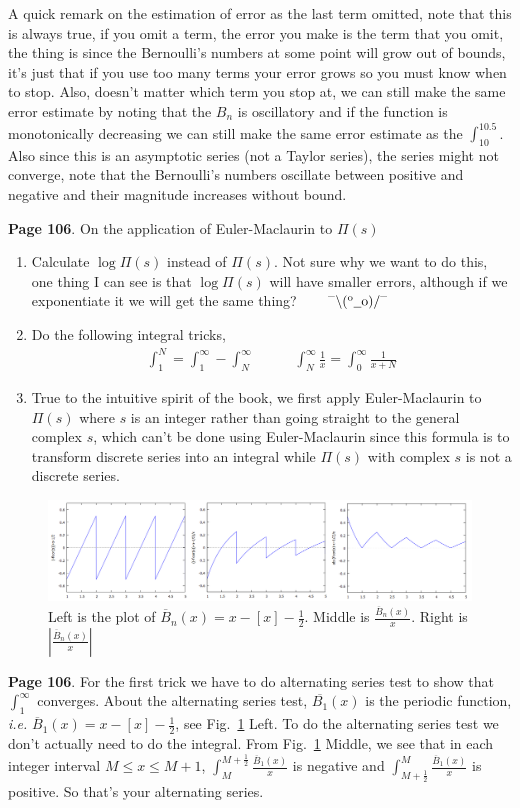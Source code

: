 \documentclass[aps,preprint,preprintnumbers,nofootinbib,showpacs,prd]{revtex4-1}
\newcommand{\ie}{{\it i.e.} }
\newcommand{\nbea}{\begin{eqnarray*}}
\newcommand{\neea}{\end{eqnarray*}}
\newcommand{\dunno}{$ {}^{\mbox {--}}\backslash(^{\rm o}{}\underline{\hspace{0.2cm}}{\rm o})/^{\mbox {--}}$}
\begin{document}
%
A quick remark on the estimation of error as the last term omitted, note that this is always true, if you omit a term, the error you make is the term that you omit, the thing is since the Bernoulli's numbers at some point will grow out of bounds, it's just that if you use too many terms your error grows so you must know when to stop. Also, doesn't matter which term you stop at, we can still make the same error estimate by noting that the $B_n$ is oscillatory and if the function is monotonically decreasing we can still make the same error estimate as the $\int_{10}^{10.5}$. Also since this is an asymptotic series (not a Taylor series), the series might not converge, note that the Bernoulli's numbers oscillate between positive and negative and their magnitude increases without bound.


{\bf Page 106}. On the application of Euler-Maclaurin to $\Pi(s)$
%
\begin{enumerate}
\item Calculate $\log \Pi(s)$ instead of $\Pi(s)$. Not sure why we want to do this, one thing I can see is that $\log \Pi(s)$ will have smaller errors, although if we exponentiate it we will get the same thing? ~~~ \dunno
\item Do the following integral tricks, 
%
\nbea
\int_1^N = \int_1^\infty - \int_N^\infty ~~~~~~~~~~~~~ \int_N^\infty \frac{1}{x} = \int_0^\infty \frac{1}{x + N}
\neea
%
\item True to the intuitive spirit of the book, we first apply Euler-Maclaurin to $\Pi(s)$ where $s$ is an integer rather than going straight to the general complex $s$, which can't be done using Euler-Maclaurin since this formula is to transform discrete series into an integral while $\Pi(s)$ with complex $s$ is not a discrete series.
\end{enumerate}
%
%
\begin{figure}
\centering
  \includegraphics[width=1.00\linewidth]{B_over_x.png}
  \caption{Left is the plot of $\overline{B}_n(x) = x - [x]  -\frac{1}{2}$. Middle is $\frac{\overline{B}_n(x)}{x}$. Right is $\left|\frac{\overline{B}_n(x)}{x}\right|$}
\label{fig:B_over_x}
\end{figure}
%
{\bf Page 106}. For the first trick we have to do alternating series test to show that $\int_1^\infty$ converges. About the alternating series test, $\overline{B_1}(x)$ is the periodic function, \ie $\overline{B}_1(x) = x - [x] - \frac{1}{2}$, see Fig.~\ref{fig:B_over_x} Left. To do the alternating series test we don't actually need to do the integral. From Fig.~\ref{fig:B_over_x} Middle, we see that in each integer interval $M \le x \le M+1$, $\int_M^{M+\frac{1}{2}} \frac{\overline{B}_1(x)}{x}$ is negative and $\int_{M+\frac{1}{2}}^M \frac{\overline{B}_1(x)}{x}$ is positive. So that's your alternating series.
\end{document}
